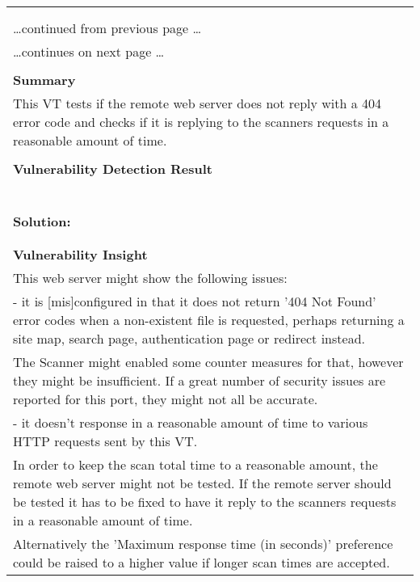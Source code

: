 \documentclass{article}
\begin{document}
\begin{longtable}{|p{}|}
\hline
\rowcolor{gvm_log}{\color{white}{Log (CVSS: 0.0) }}\\
\rowcolor{gvm_log}{\color{white}{NVT: Response Time / No 404 Error Code Check}}\\
\hline
\endfirsthead
\hfill\ldots continued from previous page \ldots \\
\hline
\endhead
\hline
\ldots continues on next page \ldots \\
\endfoot
\hline
\endlastfoot
\\
\textbf{Summary}\\
This VT tests if the remote web server does not reply with a 404
  error code and checks if it is replying to the scanners requests in a reasonable amount of time.\\

        \hline
        \\
\textbf{Vulnerability Detection Result}\\
\rowcolor{white}{\verb=The service is responding with a 200 HTTP status code to non-existent files/urls=}\\
\rowcolor{white}{$\hookrightarrow$\verb=. The following pattern is used to work around possible false detections:=}\\
\rowcolor{white}{\verb=-----=}\\
\rowcolor{white}{\verb=MyFRITZ!=}\\
\rowcolor{white}{\verb=-----=}\\

          \hline
          \\
\textbf{Solution:}\\
\\

          \hline
          \\
\textbf{Vulnerability Insight}\\
This web server might show the following issues:\\
  - it is [mis]configured in that it does not return '404 Not Found' error codes when a non-existent
  file is requested, perhaps returning a site map, search page, authentication page or redirect instead.\\
  The Scanner might enabled some counter measures for that, however they might be insufficient. If a
  great number of security issues are reported for this port, they might not all be accurate.\\
  - it doesn't response in a reasonable amount of time to various HTTP requests sent by this VT.\\
  In order to keep the scan total time to a reasonable amount, the remote web server might not be
  tested. If the remote server should be tested it has to be fixed to have it reply to the scanners
  requests in a reasonable amount of time.\\
  Alternatively the 'Maximum response time (in seconds)' preference could be raised to a higher
  value if longer scan times are accepted.\\



\end{longtable}
\end{document}
